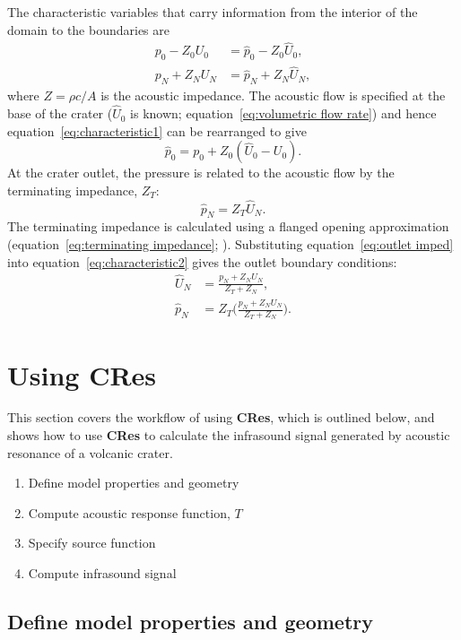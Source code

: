 \documentclass[10pt]{article}
\begin{document}
The characteristic variables that carry information from the interior of the domain to the boundaries are
\begin{align}
p_0-Z_0 U_0 & =\hat{p}_0-Z_0 \hat{U}_0,
\label{eq:characteristic1} \\
p_N+Z_N U_N & = \hat{p}_N+Z_N \hat{U}_N,
\label{eq:characteristic2}
\end{align}
where $Z = \rho c / A$ is the acoustic impedance. The acoustic flow is specified at the base of the crater ($\hat{U}_0$ is known; equation~\ref{eq:volumetric flow rate}) and hence equation~\ref{eq:characteristic1} can be rearranged to give
\begin{equation}
\hat{p}_0 = p_0 + Z_0 (\hat{U}_0 - U_0).
\end{equation}
At the crater outlet, the pressure is related to the acoustic flow by the terminating impedance, $Z_T$:
\begin{equation}
\hat{p}_N = Z_T \hat{U}_N.
\label{eq:outlet imped}
\end{equation}
The terminating impedance is calculated using a flanged opening approximation (equation~\ref{eq:terminating impedance}; \citealp{Kinsler2000, Rossing2004}).
Substituting equation~\ref{eq:outlet imped} into equation~\ref{eq:characteristic2} gives the outlet boundary conditions:
\begin{align}
\hat{U}_N & = \frac{p_N + Z_N U_N}{Z_T+Z_N}, \\
\hat{p}_N & = Z_T \bigg( \frac{p_N + Z_N U_N}{Z_T+Z_N} \bigg).
\end{align}


\section{Using {\bf CRes}}
This section covers the workflow of using {\bf CRes}, which is outlined below, and shows how to use {\bf CRes} to calculate the infrasound signal generated by acoustic resonance of a volcanic crater.
\begin{enumerate}
\item Define model properties and geometry
\item Compute acoustic response function, $T$
\item Specify source function
\item Compute infrasound signal 
\end{enumerate}

\subsection{Define model properties and geometry}
\end{document}
